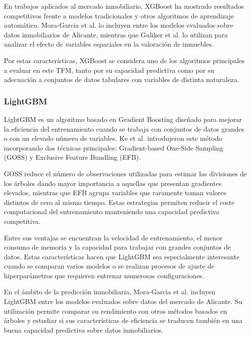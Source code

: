 \documentclass[IB]{TFUOC}%
\begin{document}
En trabajos aplicados al mercado inmobiliario, XGBoost ha mostrado resultados competitivos frente a modelos tradicionales y otros algoritmos de aprendizaje automático. Mora-Garcia et al. \cite{moragarcia2022housing} lo incluyen entre los modelos evaluados sobre datos inmobiliarios de Alicante, mientras que Guliker et al. \cite{guliker2022spatial} lo utilizan para analizar el efecto de variables espaciales en la valoración de inmuebles.

Por estas características, XGBoost se considera uno de los algoritmos principales a evaluar en este TFM, tanto por su capacidad predictiva como por su adecuación a conjuntos de datos tabulares con variables de distinta naturaleza.

\subsubsection{LightGBM}

LightGBM es un algoritmo basado en Gradient Boosting diseñado para mejorar la eficiencia del entrenamiento cuando se trabaja con conjuntos de datos grandes o con un elevado número de variables. Ke et al. \cite{ke2017lightgbm} introdujeron este método incorporando dos técnicas principales: Gradient-based One-Side Sampling (GOSS) y Exclusive Feature Bundling (EFB).

GOSS reduce el número de observaciones utilizadas para estimar las divisiones de los árboles dando mayor importancia a aquellas que presentan gradientes elevados, mientras que EFB agrupa variables que raramente toman valores distintos de cero al mismo tiempo. Estas estrategias permiten reducir el coste computacional del entrenamiento manteniendo una capacidad predictiva competitiva.

Entre sus ventajas se encuentran la velocidad de entrenamiento, el menor consumo de memoria y la capacidad para trabajar con grandes conjuntos de datos. Estas características hacen que LightGBM sea especialmente interesante cuando se comparan varios modelos o se realizan procesos de ajuste de hiperparámetros que requieren entrenar numerosas configuraciones.

En el ámbito de la predicción inmobiliaria, Mora-Garcia et al. \cite{moragarcia2022housing} incluyen LightGBM entre los modelos evaluados sobre datos del mercado de Alicante. Su utilización permite comparar su rendimiento con otros métodos basados en árboles y estudiar si sus características de eficiencia se traducen también en una buena capacidad predictiva sobre datos inmobiliarios.
\end{document}
